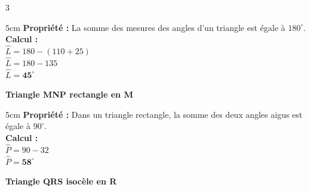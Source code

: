 \documentclass[a4paper]{book}
\begin{document}
{\begin{exerciceNote}{3}
\begin{minipage}{0.32\linewidth}
            \begin{ZoneReponse}{5cm}
                 \textbf{Propriété :} La somme des mesures des angles d'un triangle est égale à $180^\circ$. \\
                 \textbf{Calcul :} \\
                 $\widehat{L} = 180 - (110 + 25)$ \\
                 $\widehat{L} = 180 - 135$ \\
                 $\widehat{L} = \mathbf{45^\circ}$
            \end{ZoneReponse}
        \end{minipage}
        \vline
        \begin{minipage}{0.32\linewidth}
             \begin{center}        
                \textbf{Triangle MNP rectangle en M} 
                
            \end{center}

            \begin{ZoneReponse}{5cm}
                 \textbf{Propriété :} Dans un triangle rectangle, la somme des deux angles aigus est égale à $90^\circ$. \\
                 \textbf{Calcul :} \\
                 $\widehat{P} = 90 - 32$ \\
                 $\widehat{P} = \mathbf{58^\circ}$
            \end{ZoneReponse}
        \end{minipage}
        \vline
        \begin{minipage}{0.32\linewidth}
             \begin{center}     
                \textbf{Triangle QRS isocèle en R} 
           

\end{center}
\end{minipage}
\end{exerciceNote}}
\end{document}
